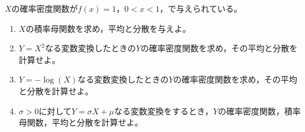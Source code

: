 \documentclass[b5paper]{jlreq}  %
\begin{document}
\begin{tcolorbox}[title= 現代数理統計学の基礎 第2章　問12 ,fonttitle=\gtfamily\sffamily\bfseries,colframe=black!50,colback=black!3]
    $X$の確率密度関数が$f(x)=1$，$0<x<1$，で与えられている。

    \begin{enumerate}[(1)\hspace{5mm}]
        \item $X$の積率母関数を求め，平均と分散を与えよ。
        \item $Y=X^2$なる変数変換したときの$Y$の確率密度関数を求め，その平均と分散を計算せよ。
        \item $Y=-\log(X)$なる変数変換したときの$Y$の確率密度関数を求め，その平均と分散を計算せよ。
        \item $\sigma>0$に対して$Y=\sigma X+\mu$なる変数変換をするとき，$Y$の確率密度関数，積率母関数，平均と分散を計算せよ。
    \end{enumerate}
\end{tcolorbox}
\end{document}
